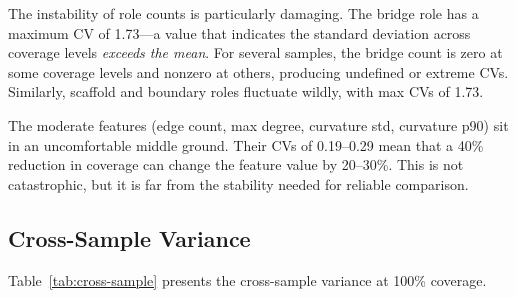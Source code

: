 \documentclass{../yalumba}
\begin{document}
The instability of role counts is particularly damaging.  The bridge
role has a maximum CV of 1.73---a value that indicates the standard
deviation across coverage levels \emph{exceeds the mean}.  For several
samples, the bridge count is zero at some coverage levels and nonzero
at others, producing undefined or extreme CVs.  Similarly, scaffold and
boundary roles fluctuate wildly, with max CVs of 1.73.

The moderate features (edge count, max degree, curvature std, curvature
p90) sit in an uncomfortable middle ground.  Their CVs of 0.19--0.29
mean that a 40\% reduction in coverage can change the feature value by
20--30\%.  This is not catastrophic, but it is far from the stability
needed for reliable comparison.

\subsection{Cross-Sample Variance}
\label{sec:cross-sample}

Table~\ref{tab:cross-sample} presents the cross-sample variance at
100\% coverage.
\end{document}
